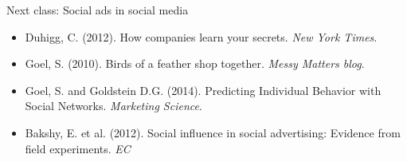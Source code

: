 \documentclass[aspectratio=169]{beamer}
\begin{document}
\begin{frame}

Next class: Social ads in social media
\begin{itemize}
\item Duhigg, C. (2012). How companies learn your secrets. \textit{New York Times}.
\item Goel, S. (2010). Birds of a feather shop together. \textit{Messy Matters blog}.
\item Goel, S. and Goldstein D.G. (2014). Predicting Individual Behavior with Social Networks. \textit{Marketing Science}.
\item Bakshy, E. et al. (2012). Social influence in social advertising: Evidence from field experiments. \textit{EC}
\end{itemize}

\end{frame}
\end{document}
